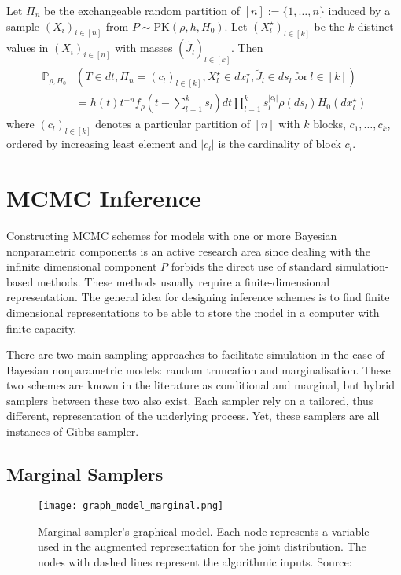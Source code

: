 \begin{proposition} \label{prop:perman2}
Let $\Pi_n$ be the exchangeable random partition of $[n] := \{1, \dots, n\}$ induced by a sample $(X_i)_{i \in [n]}$ from $P \sim \text{PK}(\rho,h,H_0)$. Let $(X_l^\star)_{l \in [k]}$ be the $k$ distinct values in $(X_i)_{i \in [n]}$ with masses $(\tilde{J}_l)_{l \in [k]}$. Then
\begin{equation} \label{eq:perman2}
\begin{aligned}
\mathbb{P}_{\rho, H_0}&(T \in dt, \Pi_n = (c_l)_{l \in [k]}, X_l^\star \in dx_l^\star, \tilde{J}_l \in ds_l\ \text{for} \ l \in [k]) \\
&= h(t) t^{-n} f_\rho(t - \sum_{l=1}^k{s_l})dt \prod_{l=1}^k{s_l^{|c_l|} \rho(ds_l)H_0(dx_l^\star)}
\end{aligned}
\end{equation}
where $(c_l)_{l \in [k]}$ denotes a particular partition of $[n]$ with $k$ blocks, $c_1,\dots , c_k$, ordered by increasing least element and $|c_l|$ is the cardinality of block $c_l$.
\end{proposition}

\section{MCMC Inference} \label{BNP_MCMC}
Constructing \gls{MCMC} schemes for models with one or more Bayesian nonparametric components is an active research area since dealing with the infinite dimensional component $P$ forbids the direct use of standard simulation-based methods. These methods usually require a finite-dimensional representation. The general idea for designing inference schemes is to find finite dimensional representations to be able to store the model in a computer with finite capacity.

There are two main sampling approaches to facilitate simulation in the case of Bayesian nonparametric models: random truncation and marginalisation. These two schemes are known in the literature as conditional and marginal, but hybrid samplers between these two also exist. Each sampler rely on a tailored, thus different, representation of the underlying process. Yet, these samplers are all instances of Gibbs sampler.

\subsection{Marginal Samplers}
\begin{figure}[h!]
\centering
    \texttt{[image: graph\_model\_marginal.png]} 
    \caption{Marginal sampler’s graphical model. Each node represents a variable used in the augmented representation for the joint distribution. The nodes with dashed lines represent the algorithmic inputs. Source: \cite{LomeliThesis}} 
    \label{fig:graph_model_marginal} 
\end{figure}

